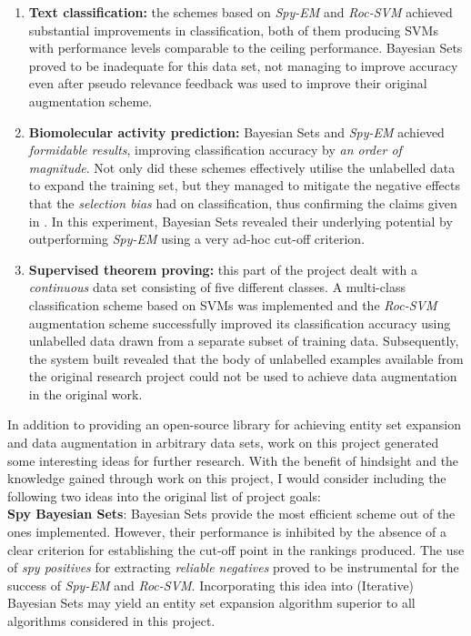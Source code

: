 \documentclass[12pt,twoside,notitlepage,amsart]{report} %
\begin{document}
	\begin{enumerate}
	
	\item \textbf{Text classification:} the schemes based on \emph{Spy-EM} and \emph{Roc-SVM} achieved substantial improvements in classification, both of them producing SVMs with performance levels comparable to the ceiling performance. Bayesian Sets proved to be inadequate for this data set, not managing to improve accuracy even after pseudo relevance feedback was used to improve their original augmentation scheme. 
	
	\item \textbf{Biomolecular activity prediction:} Bayesian Sets and \emph{Spy-EM} achieved \emph{formidable results}, improving classification accuracy by \emph{an order of magnitude}. Not only did these schemes effectively utilise the unlabelled data to expand the training set, but they managed to mitigate the negative effects that the \emph{selection bias} had on classification, thus confirming the claims given in \cite{Li210}. In this experiment, Bayesian Sets revealed their underlying potential by outperforming \emph{Spy-EM} using a very ad-hoc cut-off criterion. 

\item \textbf{Supervised theorem proving:} this part of the project dealt with a \emph{continuous} data set consisting of five different classes. A multi-class classification scheme based on SVMs was implemented and the \emph{Roc-SVM} augmentation scheme successfully improved its classification accuracy using unlabelled data drawn from a separate subset of training data. Subsequently, the system built revealed that the body of unlabelled examples available from the original research project could not be used to achieve data augmentation in the original work.

\end{enumerate}

In addition to providing an open-source library for achieving entity set expansion and data augmentation in arbitrary data sets, work on this project generated some interesting ideas for further research. With the benefit of hindsight and the knowledge gained through work on this project, I would consider including the following two ideas into the original list of project goals: \\
	
\textbf{{Spy Bayesian Sets}}: Bayesian Sets provide the most efficient scheme out of the ones implemented. However, their performance is inhibited by the absence of a clear criterion for establishing the cut-off point in the rankings produced. The use of \emph{spy positives} for extracting \emph{reliable negatives} proved to be instrumental for the success of \emph{Spy-EM} and \emph{Roc-SVM}. Incorporating this idea into (Iterative) Bayesian Sets may yield an entity set expansion algorithm superior to all algorithms considered in this project. \\
	
\end{document}
